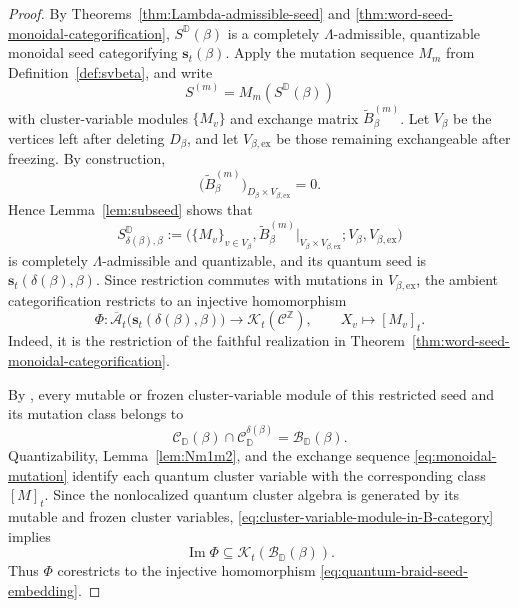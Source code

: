 \documentclass[12pt, reqno]{amsart}
\theoremstyle{plain}
\theoremstyle{definition}
\numberwithin{equation}{section}
\newcommand{\ZZ}{\mathbb{Z}}
\newcommand{\DD}{\mathbb{D}}
\begin{document}
\begin{proof}
By Theorems~\ref{thm:Lambda-admissible-seed} and
\ref{thm:word-seed-monoidal-categorification},
\(S^{\DD}(\beta)\) is a completely \(\Lambda\)-admissible,
quantizable monoidal seed categorifying \(\mathbf s_t(\beta)\).
Apply the mutation sequence \(M_m\) from
Definition~\ref{def:svbeta}, and write
\[
    S^{(m)}=M_m(S^{\DD}(\beta))
\]
with cluster-variable modules \(\{M_v\}\) and exchange matrix
\(\widetilde B_\beta^{(m)}\). Let \(V_\beta\) be the vertices left
after deleting \(D_\beta\), and let \(V_{\beta,\mathrm{ex}}\) be those
remaining exchangeable after freezing. By construction,
\begin{equation}\label{eq:deleted-zero-block-proof}
    \bigl(\widetilde B_\beta^{(m)}\bigr)_{
        D_\beta\times V_{\beta,\mathrm{ex}}}
    =0.
\end{equation}
Hence Lemma~\ref{lem:subseed} shows that
\begin{equation}\label{eq:restricted-braid-monoidal-seed}
    S_{\delta(\beta),\beta}^{\DD}
    :=
    \bigl(
        \{M_v\}_{v\in V_\beta},
        \widetilde B_\beta^{(m)}
          |_{V_\beta\times V_{\beta,\mathrm{ex}}};
        V_\beta,V_{\beta,\mathrm{ex}}
    \bigr)
\end{equation}
is completely \(\Lambda\)-admissible and quantizable, and its quantum
seed is \(\mathbf s_t(\delta(\beta),\beta)\). Since restriction
commutes with mutations in \(V_{\beta,\mathrm{ex}}\), the ambient
categorification restricts to an injective homomorphism
\begin{equation}\label{eq:ambient-realization-restricted-seed}
    \Phi\colon
    \overline{\mathcal A}_t
    \bigl(\mathbf s_t(\delta(\beta),\beta)\bigr)
    \longrightarrow
    \mathcal{K}_t(\mathscr C^{\ZZ}),
    \qquad
    X_v\longmapsto[M_v]_t.
\end{equation}
Indeed, it is the restriction of the faithful realization in
Theorem~\ref{thm:word-seed-monoidal-categorification}.

By \cite[Theorem~6.8]{bi2026towards}, every mutable or frozen
cluster-variable module of this restricted seed and its mutation class
belongs to
\begin{equation}\label{eq:cluster-variable-module-in-B-category}
    \mathscr C_{\DD}(\beta)
    \cap
    \mathscr C_{\DD}^{\delta(\beta)}
    =
    \mathscr B_{\DD}(\beta).
\end{equation}
Quantizability, Lemma~\ref{lem:Nm1m2}, and the exchange sequence
\eqref{eq:monoidal-mutation} identify each quantum cluster variable
with the corresponding class \([M]_t\). Since the nonlocalized
quantum cluster algebra is generated by its mutable and frozen cluster
variables, \eqref{eq:cluster-variable-module-in-B-category} implies
\[
    \operatorname{Im}\Phi
    \subseteq
    \mathcal K_t(\mathscr B_{\DD}(\beta)).
\]
Thus \(\Phi\) corestricts to the injective homomorphism
\eqref{eq:quantum-braid-seed-embedding}.
\end{proof}
\end{document}
